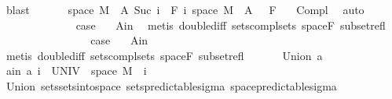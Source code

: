 \begin{isabellebody}
\ blast\isanewline
\ \ \isamarkupfalse%
\ \isamarkupfalse%
\ {\isacharasterisk}{\kern0pt}{\isacharcolon}{\kern0pt}\ {\isachardoublequoteopen}{\isacharparenleft}{\kern0pt}space\ M\ {\isacharminus}{\kern0pt}\ A\ {\isacharparenleft}{\kern0pt}Suc\ i{\isacharparenright}{\kern0pt}{\isacharparenright}{\kern0pt}\ {\isasymin}\ F\ i{\isachardoublequoteclose}\ {\isachardoublequoteopen}{\isacharparenleft}{\kern0pt}space\ M\ {\isacharminus}{\kern0pt}\ A\ {}{\isacharparenright}{\kern0pt}\ {\isasymin}\ F\ {}{\isachardoublequoteclose}\ \isamarkupfalse%
\ Compl{\isacharparenleft}{\kern0pt}{}{\isacharcomma}{\kern0pt}{}{\isacharparenright}{\kern0pt}\ \isamarkupfalse%
\ auto\isanewline
\ \ \isacommand{{\isacharbraceleft}{\kern0pt}}\isamarkupfalse%
\isanewline
\ \ \ \ \isamarkupfalse%
\ {}\isanewline
\ \ \ \ \isamarkupfalse%
\ \isamarkupfalse%
\ {\isacharquery}{\kern0pt}case\ \isamarkupfalse%
\ {\isacharasterisk}{\kern0pt}\ A{\isacharunderscore}{\kern0pt}in\ \isamarkupfalse%
\ {\isacharparenleft}{\kern0pt}metis\ double{\isacharunderscore}{\kern0pt}diff\ sets{\isachardot}{\kern0pt}compl{\isacharunderscore}{\kern0pt}sets\ space{\isacharunderscore}{\kern0pt}F\ subset{\isacharunderscore}{\kern0pt}refl{\isacharparenright}{\kern0pt}\isanewline
\ \ \isamarkupfalse%
\isanewline
\ \ \ \ \isamarkupfalse%
\ {}\isanewline
\ \ \ \ \isamarkupfalse%
\ \isamarkupfalse%
\ {\isacharquery}{\kern0pt}case\ \isamarkupfalse%
\ {\isacharasterisk}{\kern0pt}\ A{\isacharunderscore}{\kern0pt}in\ \isamarkupfalse%
\ {\isacharparenleft}{\kern0pt}metis\ double{\isacharunderscore}{\kern0pt}diff\ sets{\isachardot}{\kern0pt}compl{\isacharunderscore}{\kern0pt}sets\ space{\isacharunderscore}{\kern0pt}F\ subset{\isacharunderscore}{\kern0pt}refl{\isacharparenright}{\kern0pt}\isanewline
\ \ \isacommand{{\isacharbraceright}{\kern0pt}}\isamarkupfalse%
\isanewline
{}\isamarkupfalse%
\isanewline
\ \ \isamarkupfalse%
\ {\isacharparenleft}{\kern0pt}Union\ a{\isacharparenright}{\kern0pt}\isanewline
\ \ \isamarkupfalse%
\ a{\isacharunderscore}{\kern0pt}in{\isacharcolon}{\kern0pt}\ {\isachardoublequoteopen}a\ i\ {\isasymsubseteq}\ UNIV\ {\isasymtimes}\ space\ M{\isachardoublequoteclose}\ \ i\ \isamarkupfalse%
\ Union{\isacharparenleft}{\kern0pt}{}{\isacharparenright}{\kern0pt}\ sets{\isachardot}{\kern0pt}sets{\isacharunderscore}{\kern0pt}into{\isacharunderscore}{\kern0pt}space\ sets{\isacharunderscore}{\kern0pt}predictable{\isacharunderscore}{\kern0pt}sigma\ space{\isacharunderscore}{\kern0pt}predictable{\isacharunderscore}{\kern0pt}sigma\ \isamarkupfalse%

\end{isabellebody}
